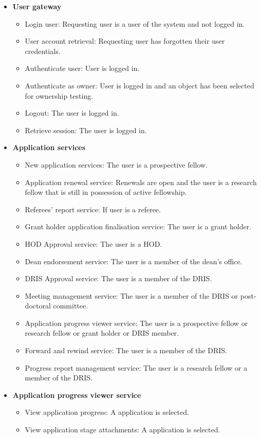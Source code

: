 \documentclass[12pt]{article}
\begin{document}
\begin{itemize}
	\item \textbf{User gateway}
		\begin{itemize}
			\item Login user: Requesting user is a user of the system and not logged in.
			\item User account retrieval: Requesting user has forgotten their user credentials.				
			\item Authenticate user: User is logged in.	
			\item Authenticate as owner: User is logged in and an object has been selected for ownership testing.
			\item Logout: The user is logged in.
			\item Retrieve session: The user is logged in.						
		\end{itemize}
		
	\item\textbf{Application services}
		\begin{itemize}
			\item New application services: The user is a prospective fellow.
			\item Application renewal service: Renewals are open and the user is a research fellow that is still in possession of active fellowship.
			\item Referees' report service: If user is a referee.
			\item Grant holder application finalisation service:  The user is a grant holder.
			\item HOD Approval service: The user is a HOD.
			\item Dean endorsement service: The user is a member of the dean's office.
			\item DRIS Approval service:  The user is a member of the DRIS.
			\item Meeting management service:  The user is a member of the DRIS or post-doctoral committee.
			\item Application progress viewer service: The user is a prospective fellow or research fellow or grant holder or DRIS member.
			\item Forward and rewind service: The user is a member of the DRIS.
			\item Progress report management service: The user is a research fellow or a member of the DRIS.	
		\end{itemize}
		
	\item \textbf{Application progress viewer service}
		\begin{itemize}
			\item View application progress: A application is selected.
			\item View application stage attachments: A application is selected.
		\end{itemize}
		

\end{itemize}
\end{document}
